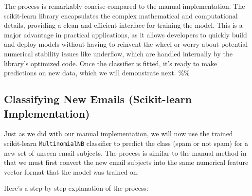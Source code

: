 \documentclass[12pt,a4paper]{article}
\begin{document}
The process is remarkably concise compared to the manual implementation. The scikit-learn library encapsulates the complex mathematical and computational details, providing a clean and efficient interface for training the model. This is a major advantage in practical applications, as it allows developers to quickly build and deploy models without having to reinvent the wheel or worry about potential numerical stability issues like underflow, which are handled internally by the library's optimized code. Once the classifier is fitted, it's ready to make predictions on new data, which we will demonstrate next.
\%\%


\subsection{Classifying New Emails (Scikit-learn Implementation)}

Just as we did with our manual implementation, we will now use the trained scikit-learn \texttt{MultinomialNB} classifier to predict the class (spam or not spam) for a new set of unseen email subjects. The process is similar to the manual method in that we must first convert the new email subjects into the same numerical feature vector format that the model was trained on.

Here's a step-by-step explanation of the process:
\end{document}
